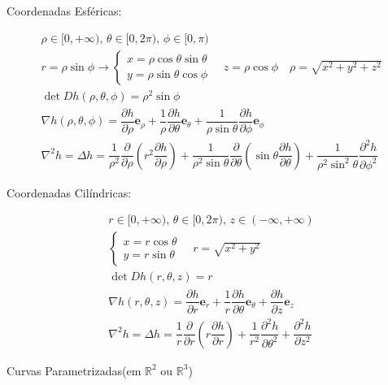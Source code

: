 	\begin{large}
	Coordenadas Esféricas:
	\end{large}
	\begin{gather*}
	\rho\in[0,+\infty), \,\theta\in[0,2\pi), \, \phi\in[0,\pi)\\
	r=\rho\sin\phi \rightarrow	
	\begin{cases}
	x=\rho\cos\theta\sin\theta \\
	y=\rho\sin\theta\cos\phi	
	\end{cases}\hspace{12pt}
	z=\rho\cos\phi \hspace{12pt} \rho=\sqrt{x^2+y^2+z^2}\\
	\det Dh(\rho,\theta, \phi)= \rho^2\sin\phi \\
    \nabla h(\rho, \theta, \phi) = \dfrac{\partial h}{\partial \rho} \mathbf{e}_\rho + \dfrac{1}{\rho}\dfrac{\partial h}{\partial \theta}\mathbf{e}_\theta + \dfrac{1}{\rho\sin\theta}\dfrac{\partial h}{\partial \phi}\mathbf{e}_\phi \\
\nabla^2 h = \Delta h = \dfrac{1}{\rho^2}\dfrac{\partial}{\partial \rho}\left(r^2\dfrac{\partial h}{\partial \rho}\right) + \dfrac{1}{\rho^2 \sin\theta}\dfrac{\partial}{\partial\theta}\left(\sin\theta \dfrac{\partial h}{\partial \theta} \right) + \dfrac{1}{\rho^2 \sin^2\theta}\dfrac{\partial^2 h}{\partial \phi^2}
	\end{gather*}
	
	
	\begin{large}
	Coordenadas Cilíndricas:
	\end{large}
	\begin{gather*}
	r\in[0,+\infty), \,\theta\in[0,2\pi), 
	\, z\in(-\infty,+\infty)\\
	\begin{cases}
	x=r\cos\theta \\
	y=r\sin\theta	
	\end{cases}\hspace{12pt}
	r=\sqrt{x^2+y^2}\\
	\det Dh(r,\theta,z) = r \\
    \nabla h(r, \theta, z) = \dfrac{\partial h}{\partial r} \mathbf{e}_r + \dfrac{1}{r}\dfrac{\partial h}{\partial \theta}\mathbf{e}_\theta + \dfrac{\partial h}{\partial z}\mathbf{e}_z \\
    \nabla^2 h = \Delta h = \dfrac{1}{r}\dfrac{\partial}{\partial r}\left( r \dfrac{\partial h}{\partial r}\right) + \dfrac{1}{r^2}\dfrac{\partial^2 h}{\partial \theta^2} + \dfrac{\partial^2 h}{\partial z^2}
	\end{gather*}
	\hline
	\begin{center}		
		\begin{Large}
			Curvas Parametrizadas(em $\mathbb{R}^2$ ou $\mathbb{R}^3$)
		\end{Large}
	\end{center}
	
